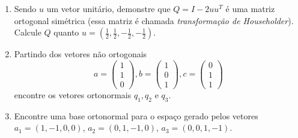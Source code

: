 \documentclass[12pt]{article}
\newcommand{\norm}[1]{\| #1 \|}
\begin{document}
\begin{enumerate}

   \item Sendo $u$ um vetor unitário, demonstre que $Q=I-2uu^T$ é uma matriz ortogonal simétrica (essa matriz é chamada \emph{transformação de Householder}). Calcule $Q$ quanto $u = (\frac{1}{2},\frac{1}{2},-\frac{1}{2},-\frac{1}{2})$.
   
   \item Partindo dos vetores não ortogonais
   $$a =
   \begin{pmatrix}
      1\\1\\0
   \end{pmatrix}, b =
   \begin{pmatrix}
      1 \\ 0 \\1
   \end{pmatrix}
   , c =
   \begin{pmatrix}
      0\\1\\1
   \end{pmatrix}$$
   encontre os vetores ortonormais $q_1, q_2$ e $q_3$.

   \item Encontre uma base ortonormal para o espaço gerado pelos vetores $a_1 = (1,-1,0,0)$, $a_2 = (0,1,-1,0)$, $a_3 = (0,0,1,-1)$.


\end{enumerate}
\end{document}
